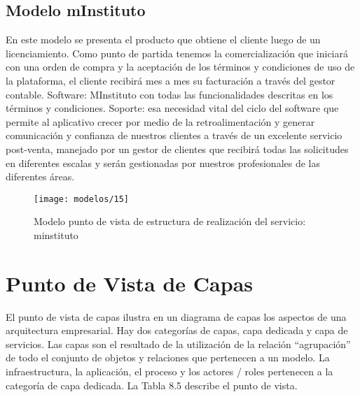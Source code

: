     \subsection{Modelo mInstituto}
    En este modelo se presenta el producto que obtiene el cliente luego de un licenciamiento. Como punto de partida tenemos la comercialización que iniciará con una orden de compra y la aceptación de los términos y condiciones de uso de la plataforma, el cliente recibirá mes a mes su facturación a través del gestor contable. Software: MInstituto con todas las funcionalidades descritas en los términos y condiciones. Soporte: esa necesidad vital del ciclo del software que permite al aplicativo crecer por medio de la retroalimentación y generar comunicación y confianza de nuestros clientes a través de un excelente servicio post-venta, manejado por un gestor de clientes que recibirá todas las solicitudes en diferentes escalas y serán gestionadas por nuestros profesionales de las diferentes áreas.
    
    \begin{figure}[H]
    	\centering
    	\texttt{[image: modelos/15]}
    	\captionsetup{width=.95\textwidth}
    	\caption{Modelo punto de vista de estructura de realización del servicio: minstituto}
    	\label{modelo15}
    \end{figure}

\section{Punto de Vista de Capas}
El punto de vista de capas ilustra en un diagrama de capas los aspectos de una arquitectura
empresarial. Hay dos categorías de capas, capa dedicada y capa de servicios. Las capas
son el resultado de la utilización de la relación “agrupación” de todo el conjunto de objetos
y relaciones que pertenecen a un modelo. La infraestructura, la aplicación, el proceso
y los actores / roles pertenecen a la categoría de capa dedicada. La Tabla 8.5 describe el
punto de vista.
    
